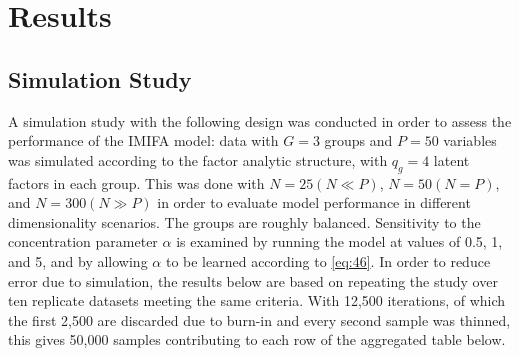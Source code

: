 \documentclass[a4paper,12pt,fleqn]{article}
\numberwithin{equation}{section}
\begin{document}
\section[Results]{Results}
\subsection[Simulation Study]{Simulation Study}
A simulation study with the following design was conducted in order to assess the performance of the IMIFA model: data with $G=3$ groups and $P=50$ variables was simulated according to the factor analytic structure, with $q_g=4$ latent factors in each group. This was done with $N=25 (N \ll P)$, $N=50 (N = P)$, and $N=300 (N \gg P)$ in order to evaluate model performance in different dimensionality scenarios. The groups are roughly balanced. Sensitivity to the concentration parameter $\alpha$ is examined by running the model at values of 0.5, 1, and 5, and by allowing $\alpha$ to be learned according to \eqref{eq:46}. In order to reduce error due to simulation, the results below are based on repeating the study over ten replicate datasets meeting the same criteria. With 12,500 iterations, of which the first 2,500 are discarded due to burn-in and every second sample was thinned, this gives 50,000 samples contributing to each row of the aggregated table below.\newline
\end{document}
